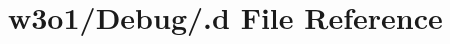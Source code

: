 \hypertarget{w3o1_2_debug_2_8d}{}\section{w3o1/\+Debug/.d File Reference}
\label{w3o1_2_debug_2_8d}
